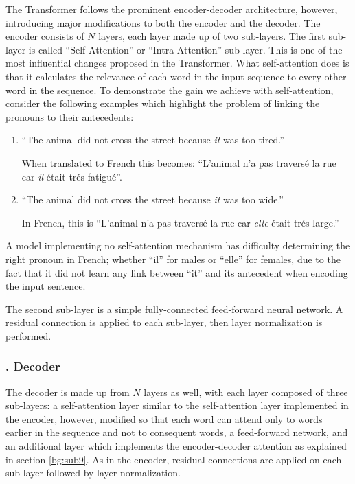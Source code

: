The Transformer follows the prominent encoder-decoder architecture, however, introducing major modifications to both the encoder and the decoder. The encoder consists of $N$ layers, each layer made up of two sub-layers. The first sub-layer is called  \enquote{Self-Attention} or \enquote{Intra-Attention} sub-layer. This is one of the most influential changes proposed in the Transformer. What self-attention does is that it calculates the relevance of each word in the input sequence to every other word in the sequence. To demonstrate the gain we achieve with self-attention, consider the following examples which highlight the problem of linking the pronouns to their antecedents:
\begin{enumerate}
	\item \enquote{The animal did not cross the street because \textit{it} was too tired.}
	
	
	
	When translated to French this becomes: \enquote{L'animal n'a pas travers\'e la rue car \textit{il} \'etait tr\'es fatigu\'e}. 
	\item \enquote{The animal did not cross the street because \textit{it} was too wide.} 
	
	
	In French, this is  \enquote{L'animal n'a pas travers\'e la rue car \textit{elle} \'etait tr\'es large.}
\end{enumerate}


A model implementing no self-attention mechanism has difficulty determining the right pronoun in French; whether \enquote{il} for males or \enquote{elle} for females, due to the fact that it did not learn any link between \enquote{it} and its antecedent when encoding the input sentence.


The second sub-layer is a simple fully-connected feed-forward neural network. A residual connection \cite{he2016deep} is applied to each sub-layer, then layer normalization \cite{ba2016layer} is performed.


\subsubsection{. Decoder} 
\label{bg:subsub13}
The decoder is made up from $N$ layers as well, with each layer composed of three sub-layers: a self-attention layer similar to the self-attention layer implemented in the encoder, however, modified so that each word can attend only to words earlier in the sequence and not to consequent words, a feed-forward network, and an additional layer which implements the encoder-decoder attention as explained in section \ref{bg:sub9}. As in the encoder, residual connections are applied on each sub-layer followed by layer normalization.


